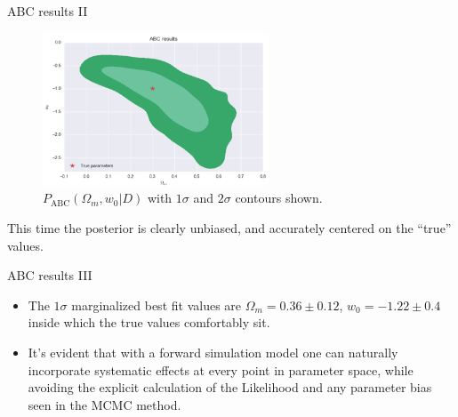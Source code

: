 \documentclass{beamer}
\theoremstyle{remark}
\begin{document}
\begin{frame}{ABC results II}
\begin{figure}[H]
    \centering
    \includegraphics[width=0.6\textwidth]{astroabc_abc_results_2.png}
    \caption{$P_{\text{ABC}}(\Omega_m, w_0|D)$ with $1\sigma$ and $2\sigma$ contours shown.}
\end{figure}
This time the posterior is clearly unbiased, and accurately centered on the ``true'' values.
\end{frame}

\begin{frame}{ABC results III}
\begin{itemize}[<+->]
    \item The $1\sigma$ marginalized best fit values are $\Omega_m = 0.36\pm 0.12$, $w_0 = -1.22\pm 0.4$ inside which the true values comfortably sit. 
    \item It's evident that with a forward simulation model one can naturally incorporate systematic effects at every point in parameter space, while avoiding the explicit calculation of the Likelihood and any parameter bias seen in the MCMC method.
\end{itemize}
\end{frame}
\end{document}
